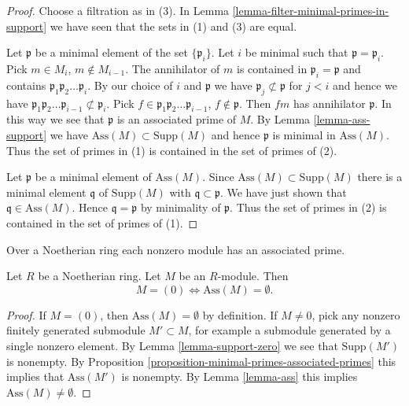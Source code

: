 \begin{proof}
Choose a filtration as in (3).
In Lemma \ref{lemma-filter-minimal-primes-in-support}
we have seen that the sets in (1) and (3) are equal.

\medskip\noindent
Let $\mathfrak p$ be a minimal element of the set $\{\mathfrak p_i\}$.
Let $i$ be minimal such that $\mathfrak p = \mathfrak p_i$.
Pick $m \in M_i$, $m \not \in M_{i-1}$. The annihilator of $m$
is contained in $\mathfrak p_i = \mathfrak p$ and contains
$\mathfrak p_1 \mathfrak p_2 \ldots \mathfrak p_i$. By our choice of
$i$ and $\mathfrak p$ we have $\mathfrak p_j \not \subset \mathfrak p$
for $j < i$ and hence we have
$\mathfrak p_1 \mathfrak p_2 \ldots \mathfrak p_{i - 1}
\not \subset \mathfrak p_i$. Pick
$f \in \mathfrak p_1 \mathfrak p_2 \ldots \mathfrak p_{i - 1}$,
$f \not \in \mathfrak p$. Then $fm$ has annihilator $\mathfrak p$.
In this way we see that $\mathfrak p$ is an associated prime of $M$.
By Lemma \ref{lemma-ass-support} we have $\text{Ass}(M) \subset \text{Supp}(M)$
and hence $\mathfrak p$ is minimal in $\text{Ass}(M)$.
Thus the set of primes in (1) is contained in the set of primes of (2).

\medskip\noindent
Let $\mathfrak p$ be a minimal element of $\text{Ass}(M)$.
Since $\text{Ass}(M) \subset \text{Supp}(M)$ there is a minimal
element $\mathfrak q$ of $\text{Supp}(M)$ with
$\mathfrak q \subset \mathfrak p$. We have just shown that
$\mathfrak q \in \text{Ass}(M)$. Hence $\mathfrak q = \mathfrak p$
by minimality of $\mathfrak p$. Thus the set of primes in (2) is
contained in the set of primes of (1).
\end{proof}

\begin{lemma}
\label{lemma-ass-zero}
\begin{slogan}
Over a Noetherian ring each nonzero module has an associated prime.
\end{slogan}
Let $R$ be a Noetherian ring. Let $M$ be an $R$-module.
Then
$$
M = (0) \Leftrightarrow \text{Ass}(M) = \emptyset.
$$
\end{lemma}

\begin{proof}
If $M = (0)$, then $\text{Ass}(M) = \emptyset$ by definition.
If $M \not = 0$, pick any nonzero finitely generated submodule
$M' \subset M$, for example a submodule generated by a single nonzero
element. By
Lemma \ref{lemma-support-zero}
we see that $\text{Supp}(M')$ is nonempty. By
Proposition \ref{proposition-minimal-primes-associated-primes}
this implies that $\text{Ass}(M')$ is nonempty.
By
Lemma \ref{lemma-ass}
this implies $\text{Ass}(M) \not = \emptyset$.
\end{proof}

